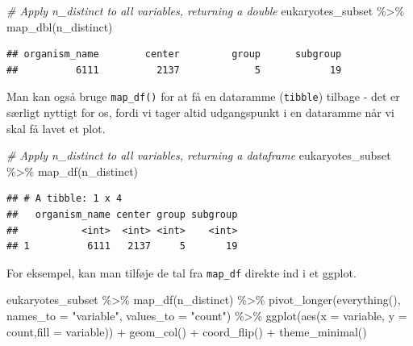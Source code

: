 \documentclass[
]{book}
\newenvironment{Shaded}{\begin{snugshade}}{\end{snugshade}}
\newcommand{\AttributeTok}[1]{\textcolor[rgb]{0.77,0.63,0.00}{#1}}
\newcommand{\CommentTok}[1]{\textcolor[rgb]{0.56,0.35,0.01}{\textit{#1}}}
\newcommand{\FunctionTok}[1]{\textcolor[rgb]{0.00,0.00,0.00}{#1}}
\newcommand{\NormalTok}[1]{#1}
\newcommand{\SpecialCharTok}[1]{\textcolor[rgb]{0.00,0.00,0.00}{#1}}
\newcommand{\StringTok}[1]{\textcolor[rgb]{0.31,0.60,0.02}{#1}}
\begin{document}
\begin{Shaded}
\begin{Highlighting}[]
\CommentTok{\# Apply n\_distinct to all variables, returning a double}
\NormalTok{eukaryotes\_subset }\SpecialCharTok{\%\textgreater{}\%} \FunctionTok{map\_dbl}\NormalTok{(n\_distinct)}
\end{Highlighting}
\end{Shaded}

\begin{verbatim}
## organism_name        center         group      subgroup 
##          6111          2137             5            19
\end{verbatim}

Man kan også bruge \texttt{map\_df()} for at få en dataramme (\texttt{tibble}) tilbage - det er særligt nyttigt for os, fordi vi tager altid udgangspunkt i en dataramme når vi skal få lavet et plot.

\begin{Shaded}
\begin{Highlighting}[]
\CommentTok{\# Apply n\_distinct to all variables, returning a dataframe}
\NormalTok{eukaryotes\_subset }\SpecialCharTok{\%\textgreater{}\%} \FunctionTok{map\_df}\NormalTok{(n\_distinct)}
\end{Highlighting}
\end{Shaded}

\begin{verbatim}
## # A tibble: 1 x 4
##   organism_name center group subgroup
##           <int>  <int> <int>    <int>
## 1          6111   2137     5       19
\end{verbatim}

For eksempel, kan man tilføje de tal fra \texttt{map\_df} direkte ind i et ggplot.

\begin{Shaded}
\begin{Highlighting}[]
\NormalTok{eukaryotes\_subset }\SpecialCharTok{\%\textgreater{}\%} 
  \FunctionTok{map\_df}\NormalTok{(n\_distinct) }\SpecialCharTok{\%\textgreater{}\%} 
  \FunctionTok{pivot\_longer}\NormalTok{(}\FunctionTok{everything}\NormalTok{(), }\AttributeTok{names\_to =} \StringTok{"variable"}\NormalTok{, }\AttributeTok{values\_to =} \StringTok{"count"}\NormalTok{) }\SpecialCharTok{\%\textgreater{}\%}
  \FunctionTok{ggplot}\NormalTok{(}\FunctionTok{aes}\NormalTok{(}\AttributeTok{x =}\NormalTok{ variable, }\AttributeTok{y =}\NormalTok{ count,}\AttributeTok{fill =}\NormalTok{ variable)) }\SpecialCharTok{+}
  \FunctionTok{geom\_col}\NormalTok{() }\SpecialCharTok{+}
  \FunctionTok{coord\_flip}\NormalTok{() }\SpecialCharTok{+} 
  \FunctionTok{theme\_minimal}\NormalTok{()}
\end{Highlighting}
\end{Shaded}
\end{document}
